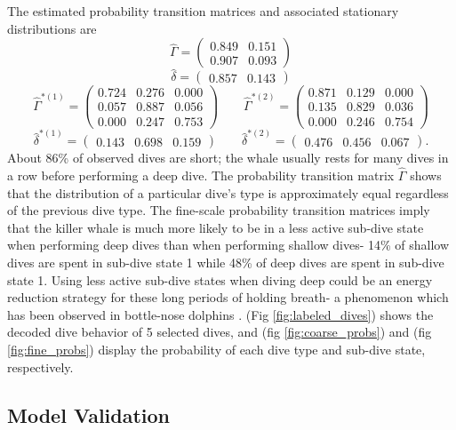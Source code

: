 The estimated probability transition matrices and associated stationary distributions are
%
$$\hat \Gamma = \begin{pmatrix} 
0.849 & 0.151 \\
0.907 & 0.093
\end{pmatrix}$$
$$\hat \delta = \begin{pmatrix} 0.857 & 0.143 \end{pmatrix}$$
%
$$\hat \Gamma^{*(1)} = \begin{pmatrix} 
0.724 & 0.276 & 0.000 \\
0.057 & 0.887 & 0.056 \\
0.000 & 0.247 & 0.753
\end{pmatrix} \qquad 
\hat \Gamma^{*(2)} = \begin{pmatrix} 
0.871 & 0.129 & 0.000 \\
0.135 & 0.829 & 0.036 \\
0.000 & 0.246 & 0.754
\end{pmatrix}$$
$$\hat \delta^{*(1)} = \begin{pmatrix} 0.143 & 0.698 & 0.159 \end{pmatrix} \qquad
\hat \delta^{*(2)} = \begin{pmatrix} 0.476 & 0.456 & 0.067 \end{pmatrix}.$$
%
About 86\% of observed dives are short; the whale usually rests for many dives in a row before performing a deep dive. The probability transition matrix $\hat \Gamma$ shows that the distribution of a particular dive's type is approximately equal regardless of the previous dive type. The fine-scale probability transition matrices imply that the killer whale is much more likely to be in a less active sub-dive state when performing deep dives than when performing shallow dives- 14\% of shallow dives are spent in sub-dive state 1 while 48\% of deep dives are spent in sub-dive state 1. Using less active sub-dive states when diving deep could be an energy reduction strategy for these long periods of holding breath- a phenomenon which has been observed in bottle-nose dolphins \citep{Williams:1999}. (Fig \ref{fig:labeled_dives}) shows the decoded dive behavior of 5 selected dives, and (fig \ref{fig:coarse_probs}) and (fig \ref{fig:fine_probs}) display the probability of each dive type and sub-dive state, respectively.

\subsection{Model Validation}
\label{subsec:model_validation}

